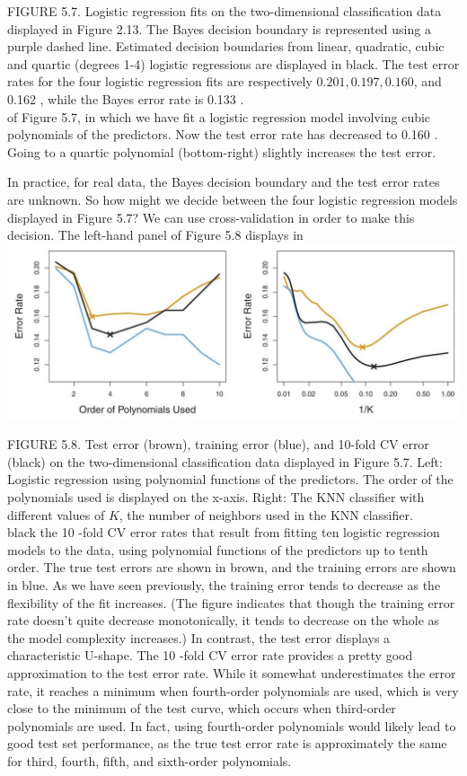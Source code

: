 \documentclass[10pt]{article}
\begin{document}
FIGURE 5.7. Logistic regression fits on the two-dimensional classification data displayed in Figure 2.13. The Bayes decision boundary is represented using a purple dashed line. Estimated decision boundaries from linear, quadratic, cubic and quartic (degrees 1-4) logistic regressions are displayed in black. The test error rates for the four logistic regression fits are respectively $0.201,0.197,0.160$, and 0.162 , while the Bayes error rate is 0.133 .\\
of Figure 5.7, in which we have fit a logistic regression model involving cubic polynomials of the predictors. Now the test error rate has decreased to 0.160 . Going to a quartic polynomial (bottom-right) slightly increases the test error.

In practice, for real data, the Bayes decision boundary and the test error rates are unknown. So how might we decide between the four logistic regression models displayed in Figure 5.7? We can use cross-validation in order to make this decision. The left-hand panel of Figure 5.8 displays in\\
\includegraphics[max width=\textwidth, center]{2025_05_05_efe77898333945044de4g-201}

FIGURE 5.8. Test error (brown), training error (blue), and 10-fold CV error (black) on the two-dimensional classification data displayed in Figure 5.7. Left: Logistic regression using polynomial functions of the predictors. The order of the polynomials used is displayed on the x-axis. Right: The KNN classifier with different values of $K$, the number of neighbors used in the KNN classifier.\\
black the 10 -fold CV error rates that result from fitting ten logistic regression models to the data, using polynomial functions of the predictors up to tenth order. The true test errors are shown in brown, and the training errors are shown in blue. As we have seen previously, the training error tends to decrease as the flexibility of the fit increases. (The figure indicates that though the training error rate doesn't quite decrease monotonically, it tends to decrease on the whole as the model complexity increases.) In contrast, the test error displays a characteristic U-shape. The 10 -fold CV error rate provides a pretty good approximation to the test error rate. While it somewhat underestimates the error rate, it reaches a minimum when fourth-order polynomials are used, which is very close to the minimum of the test curve, which occurs when third-order polynomials are used. In fact, using fourth-order polynomials would likely lead to good test set performance, as the true test error rate is approximately the same for third, fourth, fifth, and sixth-order polynomials.
\end{document}
